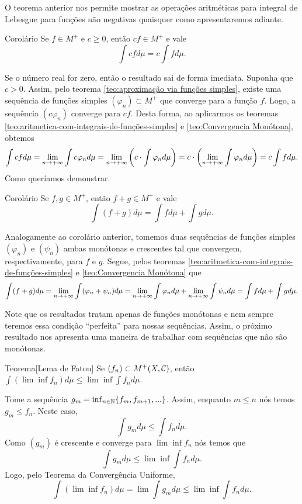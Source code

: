 O teorema anterior nos permite mostrar as operações aritméticas para integral de Lebesgue para funções não negativas quaisquer como apresentaremos adiante.

\begin{env}{Corolário}
	Se $f \in M^+$ e $c \geq 0$, então $cf \in M^+$ e vale
	$$
	\int cf d\mu = c\int f d\mu.
	$$
\end{env}


\begin{prova}
	Se o número real for zero, então o resultado sai de forma imediata.
	Suponha que $c > 0$. 
	Assim, pelo teorema \ref{teo:aproximação via funções simples}, existe uma sequência de funções simples $(\varphi_n) \subset M^+$ que converge para a função $f$.
	Logo, a sequência $(c\varphi_n)$ converge para $cf$.
	Desta forma, ao aplicarmos os teoremas \ref{teo:aritmetica-com-integrais-de-funções-simples} e 
	\ref{teo:Convergencia Monótona}, obtemos
	$$
	\int c f d\mu 
	= \displaystyle \lim_{n \to +\infty} \int c\varphi_n d\mu 
	= \displaystyle \lim_{n \to +\infty}\left( c\cdot \int \varphi_n d\mu\right)
	= c\cdot \left(\displaystyle \lim_{n \to +\infty} \int \varphi_n d\mu\right)
	= c \int f d\mu.
	$$
	Como queríamos demonstrar.
\end{prova}


\begin{env}{Corolário}
	\label{cor:soma de integrais de funções não negativas}
	Se $f, g \in M^+$, então $f + g \in M^+$ e vale
	$$
	\int (f + g) d\mu = \int f d\mu + \int g d\mu.
	$$ 	
\end{env}

\begin{prova}
	Analogamente ao corolário anterior, tomemos duas sequências de funções simples $(\varphi_n)$ e $(\psi_n)$ ambas monótonas e crescentes tal que convergem, respectivamente, para $f$ e $g$.
	Segue, pelos teoremas \ref{teo:aritmetica-com-integrais-de-funções-simples} e 
	\ref{teo:Convergencia Monótona} que
	$$
	\int(f+ g) d\mu
	= \displaystyle \lim_{n \to +\infty} \int (\varphi_n +\psi_n) d\mu
	= \displaystyle \lim_{n \to +\infty}\int \varphi_nd\mu + \displaystyle \lim_{n \to +\infty} \int \psi_n d\mu
	= \int f d\mu + \int g d\mu.
	$$
\end{prova}

Note que os resultados tratam apenas de funções monótonas e nem sempre teremos essa condição \enquote{perfeita} para nossas sequências.
Assim, o próximo resultado nos apresenta uma maneira de trabalhar com sequências que não são monótonas.

\begin{env}{Teorema}[Lema de Fatou]
	\label{teo:lema de fatou}
	Se $(f_n) \subset M^+(X, \operatorname{\mathcal{C}})$, então 
	$\displaystyle
	\int(\lim \inf f_n)d\mu \leq \lim \inf \int f_n d\mu$. 
\end{env}
\begin{prova}
	Tome a sequência $g_m = \inf_{n \in \operatorname{\mathbb{N}}}\{f_m, f_{m+1},...\}$.
	Assim, enquanto $m\leq n$ nós temos $g_m \leq f_n$.
	Neste caso,
	$$
	\int g_m d\mu \leq \int f_n d\mu.
	$$
	Como $(g_m)$ é crescente e converge para $\lim\inf f_n$ nós temos que 
	$$
	\int g_m d\mu \leq \lim \inf \int f_n d\mu.
	$$
	Logo, pelo Teorema da Convergência Uniforme,
	$$
	\int (\lim \inf f_n)d\mu = \lim \int g_m d\mu \leq \lim \inf \int f_n d\mu.
	$$ 
\end{prova}

